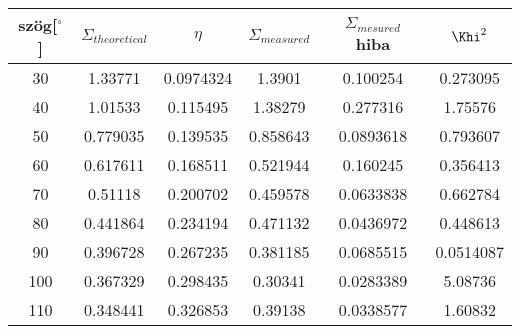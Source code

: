 \begin{center}
\begin{tabular}{|c|c|c|c|c|c|}
\hline
szög[$^{\circ}$] & $\Sigma_{theoretical}$ & $\eta$ & $\Sigma_{measured}$ & $\Sigma_{mesured}$ hiba & $\Khi^{2}$ \\
\hline
30 & 1.33771 & 0.0974324 & 1.3901 & 0.100254 & 0.273095 \\
\hline
40 & 1.01533 & 0.115495 & 1.38279 & 0.277316 & 1.75576 \\
\hline
50 & 0.779035 & 0.139535 & 0.858643 & 0.0893618 & 0.793607 \\
\hline
60 & 0.617611 & 0.168511 & 0.521944 & 0.160245 & 0.356413 \\
\hline
70 & 0.51118 & 0.200702 & 0.459578 & 0.0633838 & 0.662784 \\
\hline
80 & 0.441864 & 0.234194 & 0.471132 & 0.0436972 & 0.448613 \\
\hline
90 & 0.396728 & 0.267235 & 0.381185 & 0.0685515 & 0.0514087 \\
\hline
100 & 0.367329 & 0.298435 & 0.30341 & 0.0283389 & 5.08736 \\
\hline
110 & 0.348441 & 0.326853 & 0.39138 & 0.0338577 & 1.60832 \\
\hline
\end{tabular}
\end{center}